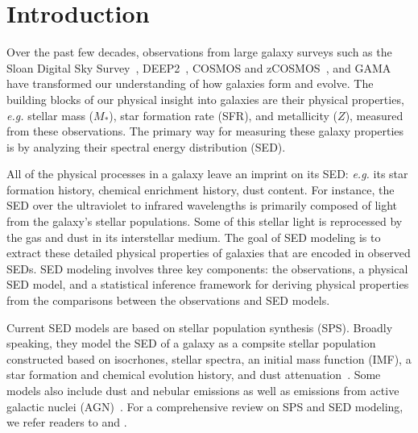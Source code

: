 \section{Introduction} \label{sec:intro} 
Over the past few decades, observations from large galaxy surveys such as the
Sloan Digital Sky Survey~\citep[SDSS;][]{york2000}, DEEP2~\citep{davis2003},
COSMOS and zCOSMOS~\citep{scoville2007, lilly2007}, and GAMA~\citep{baldry2018}
have transformed our understanding of how galaxies form and evolve. 
The building blocks of our physical insight into galaxies are their 
physical properties, \emph{e.g.} stellar mass ($M_*$), star formation rate
(SFR), and metallicity ($Z$), measured from these observations.
The primary way for measuring these galaxy properties is by analyzing their
spectral energy distribution (SED).

All of the physical processes in a galaxy leave an imprint on its SED:
\emph{e.g.} its star formation history, chemical enrichment history, dust
content. 
For instance, the SED over the ultraviolet to infrared wavelengths is
primarily composed of light from the galaxy's stellar populations. 
Some of this stellar light is reprocessed by the gas and dust in its
interstellar medium.
The goal of SED modeling is to extract these detailed physical properties of
galaxies that are encoded in observed SEDs. 
SED modeling involves three key components: the observations, a physical SED
model, and a statistical inference framework for deriving physical properties 
from the comparisons between the observations and SED models.

Current SED models are based on stellar population synthesis (SPS).
Broadly speaking, they model the SED of a galaxy as a compsite stellar
population constructed based on isocrhones, stellar spectra, an initial mass
function (IMF), a star formation and chemical evolution history, and dust
attenuation~\citep[\emph{e.g.}][]{bruzual2003, maraston2005, conroy2009,
eldridge2017}.
Some models also include dust and nebular emissions as well as emissions from
active galactic nuclei (AGN)~\citep[\emph{e.g.}][]{johnson2021}.
For a comprehensive review on SPS and SED modeling, we refer readers to
\cite{walcher2011} and \cite{conroy2013}. 

